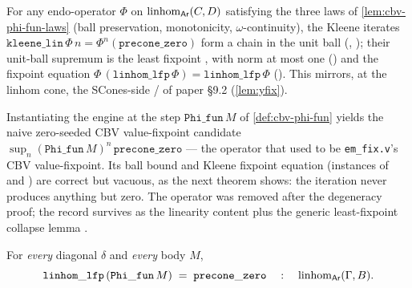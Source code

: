 \begin{definition}\label{def:cbv-kleene-lin}
\rocqok
{}\rocqok
{}\rocqok
{}\rocqok
{}
For any endo-operator $\Phi$ on $\mathrm{linhom}_{\mathsf{Ar}}(C, D)$ satisfying
the three laws of \autoref{lem:cbv-phi-fun-laws} (ball preservation,
monotonicity, $\omega$-continuity), the Kleene iterates
$\mathtt{kleene\_lin}\,\Phi\,n = \Phi^n(\mathtt{precone\_zero})$
form a chain in the unit ball
(,
); their
unit-ball supremum is the least fixpoint
, with norm at most one
() and the
fixpoint equation
$\Phi\,(\mathtt{linhom\_lfp}\,\Phi) = \mathtt{linhom\_lfp}\,\Phi$
(). This mirrors,
at the linhom cone, the SCones-side  /
 of paper \S9.2
(\autoref{lem:yfix}).
\end{definition}

Instantiating the engine at the step $\mathtt{Phi\_fun}\,M$ of
\autoref{def:cbv-phi-fun} yields the naive zero-seeded CBV
value-fixpoint candidate
$\sup_n (\mathtt{Phi\_fun}\,M)^n\,\mathtt{precone\_zero}$ --- the
operator that used to be \texttt{em\_fix.v}'s CBV value-fixpoint. Its
ball bound and Kleene fixpoint equation (instances of
 and
) are correct
but vacuous, as the next theorem shows: the iteration never produces
anything but zero. The operator was removed after the degeneracy
proof; the record survives as the linearity content
 plus the
generic least-fixpoint collapse lemma
.

\begin{theorem}%
\label{thm:cbv-yfix-degenerate}
\rocqok
{}\rocqok
{}\rocqok
{}\rocqok
{}
For \emph{every} diagonal $\delta$ and \emph{every} body $M$,
\[
  \mathtt{linhom\_lfp}\,(\mathtt{Phi\_fun}\,M)
  \;=\;
  \mathtt{precone\_zero}
  \quad : \quad
  \mathrm{linhom}_{\mathsf{Ar}}(\Gamma, B).
\]
\end{theorem}


